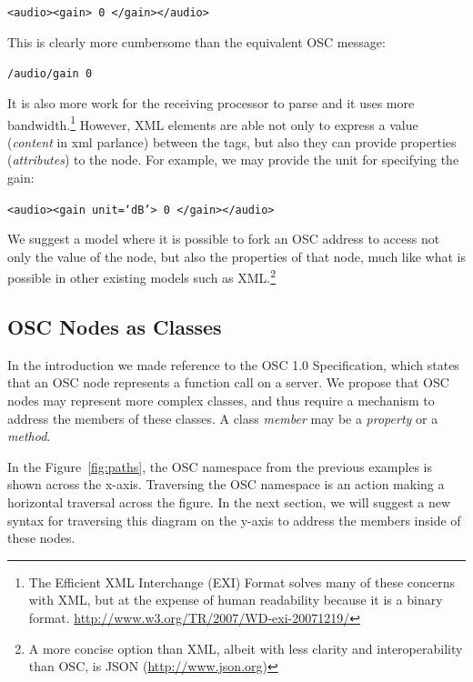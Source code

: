 \documentclass{NIME-alternate}
\begin{document}
\texttt{<audio><gain> 0 </gain></audio>}

This is clearly more cumbersome than the equivalent OSC message:

\texttt{/audio/gain 0}

It is also more work for the receiving processor to parse and it uses more bandwidth.\footnote{The Efficient XML Interchange (EXI) Format solves many of these concerns with XML, but at the expense of human readability because it is a binary format.  \url{http://www.w3.org/TR/2007/WD-exi-20071219/}} However, XML elements are able not only to express a value (\emph{content} in xml parlance) between the tags, but also they can provide properties (\emph{attributes}) to the node. For example, we may provide the unit for specifying the gain:

\texttt{<audio><gain unit=`dB'> 0 </gain></audio>}

We suggest a model where it is possible to fork an OSC address to access not only the value of the node, but also the properties of that node, much like what is possible in other existing models such as XML.\footnote{A more concise option than XML, albeit with less clarity and interoperability than OSC, is JSON (\url{http://www.json.org})}



\subsection{OSC Nodes as Classes} %
\label{sub:osc_nodes_as_classes}

In the introduction we made reference to the OSC 1.0 Specification, which states that an OSC node represents a function call on a server. We propose that OSC nodes may represent more complex classes, and thus require a mechanism to address the members of these classes. A class \emph{member} may be a \emph{property} or a \emph{method}.

In the Figure~\ref{fig:paths}, the OSC namespace from the previous examples is shown across the x-axis. Traversing the OSC namespace is an action making a horizontal traversal across the figure.  In the next section, we will suggest a new syntax for traversing this diagram on the y-axis to address the members inside of these nodes.
\end{document}
